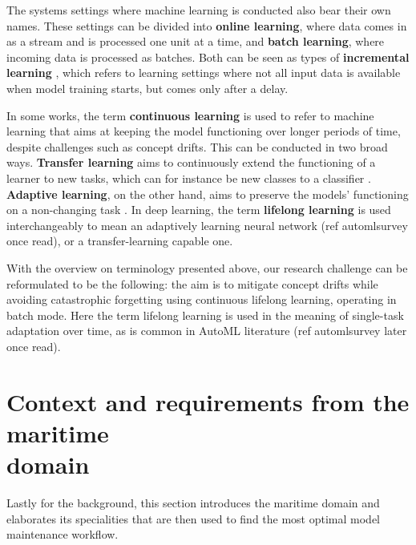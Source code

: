 The systems settings where machine learning is conducted also bear their own names. These settings can be divided into \textbf{online learning}, where data comes in as a stream and is processed one unit at a time, and \textbf{batch learning}, where incoming data is processed as batches. Both can be seen as types of \textbf{incremental learning} \cite{giraud-carrier_note_2000}, which refers to learning settings where not all input data is available when model training starts, but comes only after a delay.

In some works, the term \textbf{continuous learning} is used to refer to machine learning that aims at keeping the model functioning over longer periods of time, despite challenges such as concept drifts. This can be conducted in two broad ways. \textbf{Transfer learning} aims to continuously extend the functioning of a learner to new tasks, which can for instance be new classes to a classifier \cite{iotsurvey}. \textbf{Adaptive learning}, on the other hand, aims to preserve the models' functioning on a non-changing task \cite{conceptdriftsurvey}. In deep learning, the term \textbf{lifelong learning} is used interchangeably to mean an adaptively learning neural network (ref automlsurvey once read), or a transfer-learning capable one.

With the overview on terminology presented above, our research challenge can be reformulated to be the following: the aim is to mitigate concept drifts while avoiding catastrophic forgetting using continuous lifelong learning, operating in batch mode. Here the term lifelong learning is used in the meaning of single-task adaptation over time, as is common in AutoML literature (ref automlsurvey later once read).



\section{Context and requirements from the maritime \\domain}

Lastly for the background, this section introduces the maritime domain and elaborates its specialities that are then used to find the most optimal model maintenance workflow.

